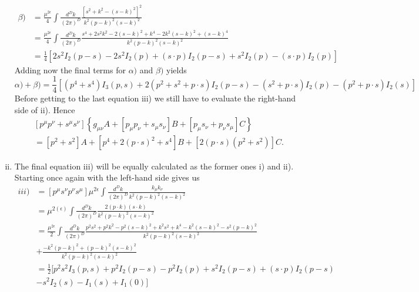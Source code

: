 \begin{enumerate}[i)]
			\begin{equation}
				\begin{split}
					\beta) &= \frac{\mu^{2\epsilon}}{4}\int\frac{d^Dk}{(2\pi)^D}\frac{[s^2+k^2-(s-k)^2]^2}{k^2(p-k)^2(s-k)^2} \\ 
					&= \frac{\mu^{2\epsilon}}{4}\int\frac{d^Dk}{(2\pi)^D}\frac{s^4+2s^2k^2-2(s-k)^2+k^4-2k^2(s-k)^2+(s-k)^4}{k^2(p-k)^2(s-k)^2} \\ 
					&= \frac{1}{4}[2s^2I_2(p-s)-2s^2I_2(p)+(s\cdot p)I_2(p-s)+s^2I_2(p)-(s\cdot p)I_2(p)]
				\end{split}
			\end{equation}
			Adding now the final terms for $\alpha)$ and $\beta)$ yields
			\begin{equation}
				\alpha) + \beta) = \frac{1}{4}[(p^4+s^4)I_3(p,s)+2(p^2+s^2+p\cdot s)I_2(p-s) - (s^2+p\cdot s)I_2(p) -(p^2+p\cdot s)I_2(s)]
			\end{equation}
			Before getting to the last equation iii) we still have to evaluate the right-hand side of ii). Hence
			\begin{equation}
				\begin{split}
					&[p^\mu p^\nu+s^\mu s^\nu] \left\{ g_{\mu\nu}A + [p_\mu p_\nu + s_\mu s_\nu]B+ [p_\mu s_\nu + p_\nu s_\mu]C \right\} \\
					&= [p^2+s^2]A+[p^4+2(p\cdot s)^2+s^4]B+[2(p\cdot s)(p^2+s^2)]C.
				\end{split}
			\end{equation}
		\item
			The final equation iii) will be equally calculated as the former ones i) and ii). Starting once again with the left-hand side gives us
			\begin{equation}
				\begin{split}
					iii) &= [p^\mu s^\nu p^\nu s^\mu]\mu^{2\epsilon}\int\frac{d^Dk}{(2\pi)^D}\frac{k_\mu k_\nu}{k^2(p-k)^2(s-k)^2} \\
					 &= \mu^{2(\epsilon)}\int\frac{d^Dk}{(2\pi)^D}\frac{2(p\cdot k)(s\cdot k)}{k^2(p-k)^2(s-k)^2} \\
					&= \frac{\mu^{2\epsilon}}{2}\int\frac{d^Dk}{(2\pi)^D} \frac{p^2s^2+p^2k^2-p^2(s-k)^2+k^2s^2+k^4-k^2(s-k)^2-s^2(p-k)^2}{k^2(p-k)^2(s-k)^2} \\
					&+ \frac{-k^2(p-k)^2+(p-k)^2(s-k)^2}{k^2(p-k)^2(s-k)^2}	 \\
					&= \frac{1}{2}[p^2s^2I_3(p,s)+p^2I_2(p-s)-p^2I_2(p)+s^2I_2(p-s)+(s\cdot p)I_2(p-s) \\				
					&-s^2I_2(s)-I_1(s)+I_1(0)] \\

\end{split}
\end{equation}
\end{enumerate}
